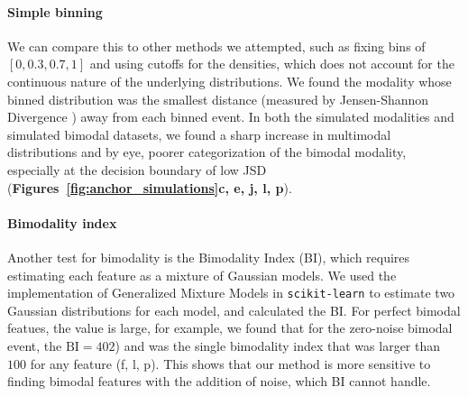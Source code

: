 \paragraph{Simple binning}
We can compare this to other methods we attempted, such as fixing bins of $[0, 0.3, 0.7, 1]$ and using cutoffs for the densities, which does not account for the continuous nature of the underlying distributions. We found the modality whose binned distribution was the smallest distance (measured by Jensen-Shannon Divergence \cite{Cover:2011vn}) away from each binned event. In both the simulated modalities and simulated bimodal datasets, we found a sharp increase in multimodal distributions and by eye, poorer categorization of the bimodal modality, especially at the decision boundary of low JSD (\textbf{Figures~\cref{fig:anchor_simulations}c, e, j, l, p}).



\paragraph{Bimodality index}
Another test for bimodality is the Bimodality Index \cite{Wang:2009wm} (BI), which requires estimating each feature as a mixture of Gaussian models. We used the implementation of Generalized Mixture Models in \texttt{scikit-learn} \cite{Pedregosa:2011tv} to estimate two Gaussian distributions for each model, and calculated the BI. For perfect bimodal featues, the value is large, for example, we found that for the zero-noise bimodal event, the $\mathrm{BI}=402$) and was the single bimodality index that was larger than $100$ for any feature (f, l, p). This shows that our method is more sensitive to finding bimodal features with the addition of noise, which BI cannot handle.

